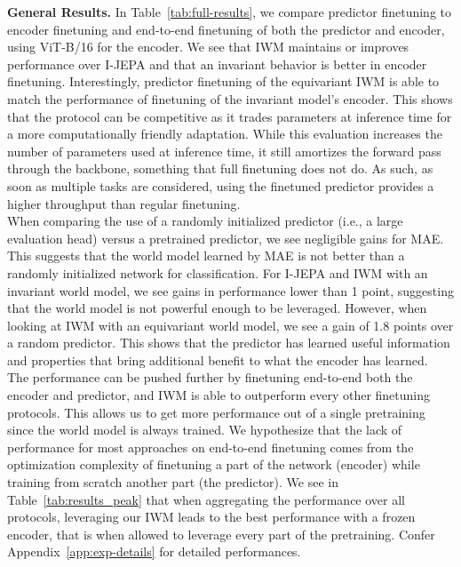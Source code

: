 \documentclass[twocolumn]{fairmeta}
\theoremstyle{plain}
\theoremstyle{definition}
\theoremstyle{remark}
\begin{document}
\textbf{General Results.} In Table~\ref{tab:full-results}, we compare predictor finetuning to encoder finetuning and end-to-end finetuning of both the predictor and encoder, using ViT-B/16 for the encoder. We see that IWM maintains or improves performance over I-JEPA and that an invariant behavior is better in encoder finetuning. Interestingly, predictor finetuning of the equivariant IWM is able to match the performance of finetuning of the invariant model's encoder. This shows that the protocol can be competitive as it trades parameters at inference time for a more computationally friendly adaptation. While this evaluation increases the number of parameters used at inference time, it still amortizes the forward pass through the backbone, something that full finetuning does not do. As such, as soon as multiple tasks are considered, using the finetuned predictor provides a higher throughput than regular finetuning. \\
When comparing the use of a randomly initialized predictor (i.e., a large evaluation head) versus a pretrained predictor, we see negligible gains for MAE. This suggests that the world model learned by MAE is not better than a randomly initialized network for classification. For I-JEPA and IWM with an invariant world model, we see gains in performance lower than 1 point, suggesting that the world model is not powerful enough to be leveraged. However, when looking at IWM with an equivariant world model, we see a gain of 1.8 points over a random predictor. This shows that the predictor has learned useful information and properties that bring additional benefit to what the encoder has learned. \\
The performance can be pushed further by finetuning end-to-end both the encoder and predictor, and IWM is able to outperform every other finetuning protocols. This allows us to get more performance out of a single pretraining since the world model is always trained.
We hypothesize that the lack of performance for most approaches on end-to-end finetuning comes from the optimization complexity of finetuning a part of the network (encoder) while training from scratch another part (the predictor).
We see in Table~\ref{tab:results_peak} that when aggregating the performance over all protocols, leveraging our IWM leads to the best performance with a frozen encoder, that is when allowed to leverage every part of the pretraining. Confer Appendix~\ref{app:exp-details} for detailed performances.
\end{document}
